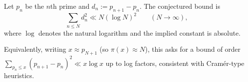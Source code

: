 Let $p_n$ be the $n$th prime and $d_n:=p_{n+1}-p_n$.
The conjectured bound is
\[
\sum_{n\le N} d_n^2 \ll N(\log N)^2\qquad (N\to\infty),
\]
where $\log$ denotes the natural logarithm and the implied constant is absolute.

Equivalently, writing $x\approx p_{N+1}$ (so $\pi(x)\approx N$), this asks for a bound of order
\(\sum_{p_n\le x}(p_{n+1}-p_n)^2 \ll x\log x\) up to log factors, consistent with Cram\'er-type heuristics.
